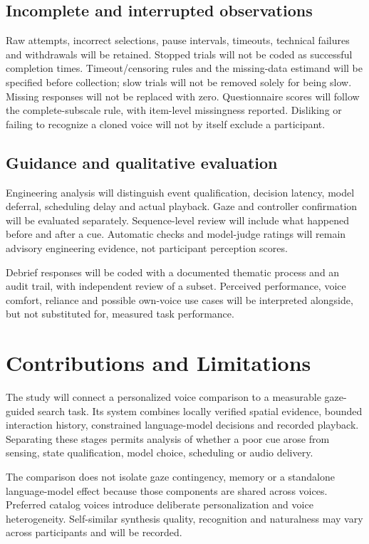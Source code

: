 \documentclass[11pt,letterpaper]{article}
\begin{document}
\subsection{Incomplete and interrupted observations}
Raw attempts, incorrect selections, pause intervals, timeouts, technical failures and withdrawals will be retained. Stopped trials will not be coded as successful completion times. Timeout/censoring rules and the missing-data estimand will be specified before collection; slow trials will not be removed solely for being slow. Missing responses will not be replaced with zero. Questionnaire scores will follow the complete-subscale rule, with item-level missingness reported. Disliking or failing to recognize a cloned voice will not by itself exclude a participant.

\subsection{Guidance and qualitative evaluation}
Engineering analysis will distinguish event qualification, decision latency, model deferral, scheduling delay and actual playback. Gaze and controller confirmation will be evaluated separately. Sequence-level review will include what happened before and after a cue. Automatic checks and model-judge ratings will remain advisory engineering evidence, not participant perception scores.

Debrief responses will be coded with a documented thematic process and an audit trail, with independent review of a subset. Perceived performance, voice comfort, reliance and possible own-voice use cases will be interpreted alongside, but not substituted for, measured task performance.
\section{Contributions and Limitations}
The study will connect a personalized voice comparison to a measurable gaze-guided search task. Its system combines locally verified spatial evidence, bounded interaction history, constrained language-model decisions and recorded playback. Separating these stages permits analysis of whether a poor cue arose from sensing, state qualification, model choice, scheduling or audio delivery.

The comparison does not isolate gaze contingency, memory or a standalone language-model effect because those components are shared across voices. Preferred catalog voices introduce deliberate personalization and voice heterogeneity. Self-similar synthesis quality, recognition and naturalness may vary across participants and will be recorded.
\end{document}
